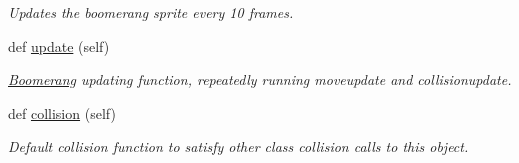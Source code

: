 \begin{DoxyCompactItemize}
\begin{DoxyCompactList}\small\item\em Updates the boomerang sprite every 10 frames. \end{DoxyCompactList}\item 
\mbox{\label{classactor_1_1boomerang_1_1_boomerang_a5e84fc23d586483105c71cc4c607264c}} 
def \hyperlink{classactor_1_1boomerang_1_1_boomerang_a5e84fc23d586483105c71cc4c607264c}{update} (self)
\begin{DoxyCompactList}\small\item\em \hyperlink{classactor_1_1boomerang_1_1_boomerang}{Boomerang} updating function, repeatedly running moveupdate and collisionupdate. \end{DoxyCompactList}\item 
\mbox{\label{classactor_1_1boomerang_1_1_boomerang_ad32ffa27cd6221ed74d144f8874eae5f}} 
def \hyperlink{classactor_1_1boomerang_1_1_boomerang_ad32ffa27cd6221ed74d144f8874eae5f}{collision} (self)
\begin{DoxyCompactList}\small\item\em Default collision function to satisfy other class collision calls to this object. \end{DoxyCompactList}\end{DoxyCompactItemize}

